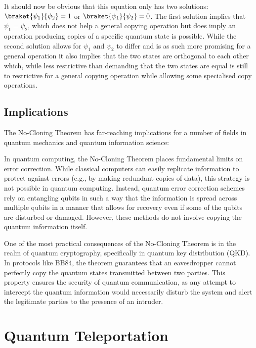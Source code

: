 It should now be obvious that this equation only has two solutions:
$\braket{\psi_1}{\psi_2} = 1$ or $\braket{\psi_1}{\psi_2} = 0$.
The first solution implies that $\psi_1 = \psi_2$, which does not help a general copying operation but does imply
an operation producing copies of a specific quantum state is possible.
While the second solution allows for $\psi_1$ and $\psi_2$ to differ and is as such more promising for a general operation
it also implies that the two states are orthogonal to each other which, while less restrictive than demanding that the
two states are equal is still to restrictive for a general copying operation while allowing some specialised copy operations.
\subsection{Implications}\label{subsec:implications}
The No-Cloning Theorem has far-reaching implications for a number of fields in
quantum mechanics and quantum information science:

In quantum computing, the No-Cloning Theorem places fundamental limits on error correction.
While classical computers can easily replicate information to protect against errors
(e.g., by making redundant copies of data), this strategy is not possible in quantum computing.
Instead, quantum error correction schemes rely on entangling qubits in such a way that the information is spread across
multiple qubits in a manner that allows for recovery even if some of the qubits are disturbed or damaged.
However, these methods do not involve copying the quantum information itself.

One of the most practical consequences of the No-Cloning Theorem is in the realm of quantum cryptography,
specifically in quantum key distribution (QKD). In protocols like BB84, the theorem guarantees that an eavesdropper
cannot perfectly copy the quantum states transmitted between two parties.
This property ensures the security of quantum communication, as any attempt to intercept the quantum information
would necessarily disturb the system and alert the legitimate parties to the presence of an intruder.


\section{Quantum Teleportation}\label{sec:quantum-teleportation}


